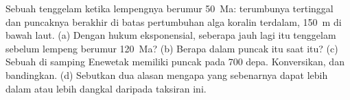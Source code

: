 \begin{exercise}[$\star\star\star$]\label{exo:b2:oceanic-islands:12}
Sebuah  tenggelam ketika lempengnya berumur \qty{50}{Ma}: terumbunya tertinggal dan puncaknya berakhir di
batas pertumbuhan alga koralin terdalam, \qty{150}{m} di bawah laut. (a) Dengan hukum
eksponensial, seberapa jauh lagi  itu tenggelam sebelum lempeng berumur \qty{120}{Ma}? (b) Berapa dalam puncak
 itu saat itu? (c) Sebuah  di samping Enewetak memiliki puncak pada 700 depa. Konversikan, dan bandingkan.
(d) Sebutkan dua alasan mengapa  yang sebenarnya dapat lebih dalam atau lebih dangkal daripada taksiran ini.
\end{exercise}

